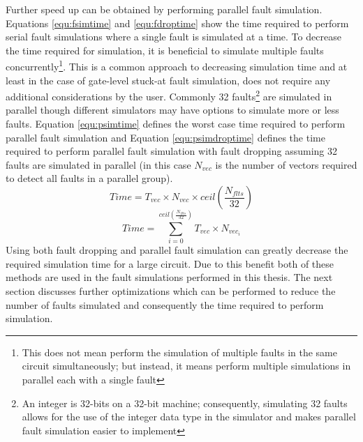 \documentclass[12pt]{report}
\begin{document}
Further speed up can be obtained by performing parallel fault simulation.  Equations \ref{equ:fsimtime} and \ref{equ:fdroptime} show the time required to perform serial fault simulations where a single fault is simulated at a time.  To decrease the time required for simulation, it is beneficial to simulate multiple faults concurrently\footnote{This does not mean perform the simulation of multiple faults in the same circuit simultaneously; but instead, it means perform multiple simulations in parallel each with a single fault\cite{parallelflts}}. This is a common approach to decreasing simulation time and at least in the case of gate-level stuck-at fault simulation, does not require any additional considerations by the user\cite{parallelflts}.  Commonly 32 faults\footnote{An integer is 32-bits on a 32-bit machine; consequently, simulating 32 faults allows for the use of the integer data type in the simulator and makes parallel fault simulation easier to implement\cite{parallelflts}} are simulated in parallel though different simulators may have options to simulate more or less faults\cite{parallelflts}.  Equation \ref{equ:psimtime} defines the worst case time required to perform parallel fault simulation and Equation \ref{equ:psimdroptime} defines the time required to perform parallel fault simulation with fault dropping assuming 32 faults are simulated in parallel (in this case $N_{vec}$ is the number of vectors required to detect all faults in a parallel group). 
\begin{equation}
Time = T_{vec} \times N_{vec} \times ceil(\frac{N_{flts}}{32})
\label{equ:psimtime}
\end{equation}
\begin{equation}
Time =  \sum_{i=0}^{ceil(\frac{N_{flts}}{32})} T_{vec} \times N_{vec_i}
\label{equ:psimdroptime}
\end{equation}
Using both fault dropping and parallel fault simulation can greatly decrease the required simulation time for a large circuit.  Due to this benefit both of these methods are used in the fault simulations performed in this thesis.  The next section discusses further optimizations which can be performed to reduce the number of faults simulated and consequently the time required to perform simulation.
\end{document}
